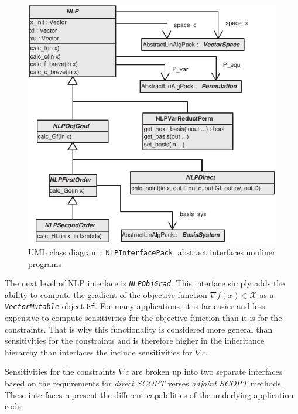 \documentclass[pdf,ps2pdf,11pt]{SANDreport}
\begin{document}
{\bsinglespace
\begin{figure}[t]
\begin{center}
\includegraphics*[bb= 0.0in 0.0in 4.2in 4.05in,scale=0.80
]{NLPInterfacePack}
\end{center}
\caption{
\label{moocho:fig:NLPInterfacePack}
UML class diagram : {}\texttt{NLPInterfacePack}, abstract interfaces nonliner programs
}
\end{figure}
\esinglespace}

The next level of NLP interface is {}\texttt{\textit{NLPObjGrad}}.
This interface simply adds the ability to compute the gradient of the
objective function $\nabla f(x) \in \mathcal{X}$ as a
{}\texttt{\textit{VectorMutable}} object {}\texttt{Gf}.  For many
applications, it is far easier and less expensive to compute
sensitivities for the objective function than it is for the
constraints.  That is why this functionality is considered more
general than sensitivities for the constraints and is therefore higher
in the inheritance hierarchy than interfaces the include sensitivities
for $\nabla c$.

Sensitivities for the constraints $\nabla c$ are broken up into two separate
interfaces based on the requirements for \textit{direct SCOPT} verses
{}\textit{adjoint SCOPT} methods.  These interfaces represent the different
capabilities of the underlying application code.
\end{document}
